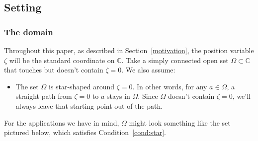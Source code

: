 \documentclass{article}
\makeatletter
\theoremstyle{plain}
\newcommand{\cond}[1]{\item[(\textsc{#1})]\protected@edef\@currentlabel{\textsc{#1}}}
\newcommand{\C}{\mathbb{C}}
\newcommand{\domain}{\Omega}
\makeatother
\begin{document}



\subsection{Setting}\label{setting}
\subsubsection{The domain}\label{setting:domain}
Throughout this paper, as described in Section~\ref{motivation}, the position variable $\zeta$ will be the standard coordinate on $\C$. Take a simply connected open set $\domain \subset \C$ that touches but doesn't contain $\zeta = 0$. We also assume:
\begin{itemize}
\cond{star}\label{cond:star} The set $\domain$ is star-shaped around $\zeta = 0$. In other words, for any $a \in \domain$, a straight path from $\zeta = 0$ to $a$ stays in $\domain$. Since $\domain$ doesn't contain $\zeta = 0$, we'll always leave that starting point out of the path.
\end{itemize}
For the applications we have in mind, $\domain$ might look something like the set pictured below, which satisfies Condition~\eqref{cond:star}.
\begin{center}
\end{center}
\end{document}

